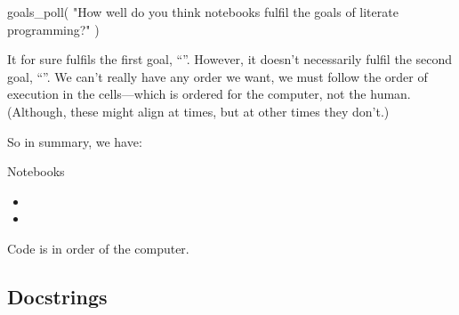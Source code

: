 \begin{frame}[fragile]
%
\begin{activity}\label{NotebooksFullfilGoals}
\begin{pycode}
goals_poll(
    "How well do you think notebooks fulfil the goals of literate programming?"
)
\end{pycode}
\end{activity}
\end{frame}

It for sure fulfils the first goal, \enquote{\LPexplain}.
However, it doesn't necessarily fulfil the second goal, \enquote{\LPorder}.
We can't really have any order we want, we must follow the order of execution 
in the cells---which is ordered for the computer, not the human.
(Although, these might align at times, but at other times they don't.)

So in summary, we have:

\begin{frame}
\begin{block}{Notebooks}
  \begin{itemize}
    \item[\(+\)] {\color{green!75!black}\LPexplain}
    \item[\(-\)] {\color{red}\LPorder}
  \end{itemize}
\end{block}

\begin{remark}
  Code is in order of the computer.
\end{remark}
\end{frame}

\subsection{Docstrings}

